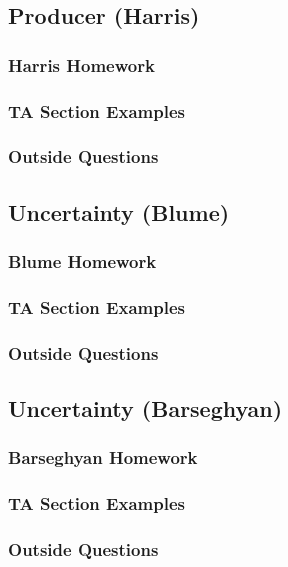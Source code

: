 \documentclass[12pt]{article}
\begin{document}
\subsection{Producer (Harris)}

\subsubsection{Harris Homework}

\subsubsection{TA Section Examples}

\subsubsection{Outside Questions}

\subsection{Uncertainty (Blume)}

\subsubsection{Blume Homework}

\subsubsection{TA Section Examples}

\subsubsection{Outside Questions}

\subsection{Uncertainty (Barseghyan)}

\subsubsection{Barseghyan Homework}

\subsubsection{TA Section Examples}

\subsubsection{Outside Questions}
\end{document}
